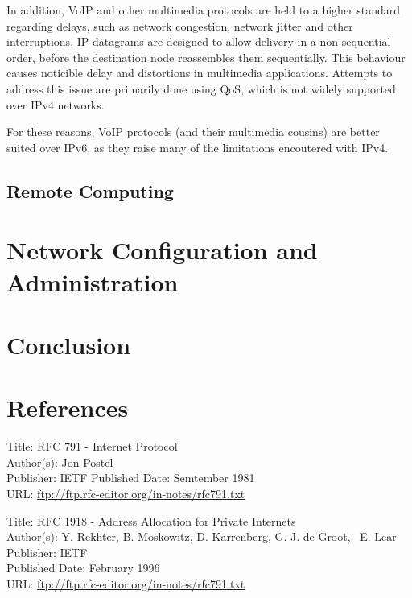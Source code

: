 \documentclass[a4paper,12pt]{article}
\begin{document}
In addition, VoIP and other multimedia protocols are held to a higher
standard regarding delays, such as network congestion, network jitter 
and other interruptions. IP datagrams are designed to allow delivery 
in a non-sequential order, before the destination node reassembles them
sequentially. This behaviour causes noticible delay and distortions in 
multimedia applications. Attempts to address this issue are primarily
done using QoS, which is not widely supported over IPv4 networks.


For these reasons, VoIP protocols (and their multimedia cousins) are
better suited over IPv6, as they raise many of the limitations
encoutered with IPv4. 

\subsection{Remote Computing}


\section{Network Configuration and Administration}


\section{Conclusion}


\section{References}

Title: RFC 791 - Internet Protocol \\
Author(s): Jon Postel \\
Publisher: IETF
Published Date: Semtember 1981 \\
URL: \url{ftp://ftp.rfc-editor.org/in-notes/rfc791.txt}	 

Title: RFC 1918 - Address Allocation for Private Internets \\
Author(s): Y. Rekhter, B. Moskowitz, D. Karrenberg, G. J. de Groot, \
\indent E. Lear \\
Publisher: IETF \\
Published Date: February 1996  \\
URL: \url{ftp://ftp.rfc-editor.org/in-notes/rfc791.txt}	 
\end{document}
